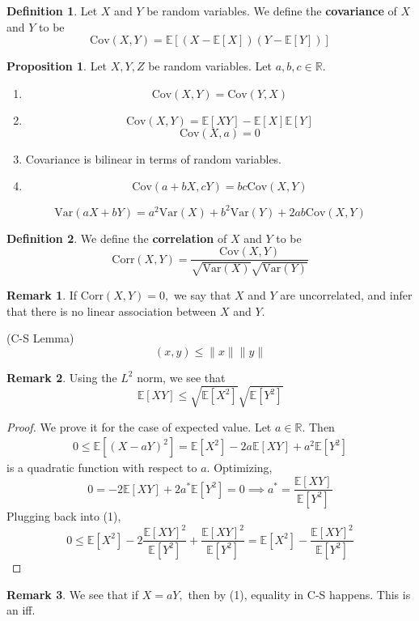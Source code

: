 \documentclass[10pt, oneside]{article}
\newcommand{\bbR}{\mathbb{R}}
\newcommand{\Var}{\text{Var}}
\newcommand{\Cov}{\text{Cov}}
\newcommand{\Corr}{\text{Corr}}
\newcommand{\bbE}{\mathbb{E}}
\theoremstyle{definition}
\newtheorem{defn}{Definition}
\newtheorem{prop}{Proposition}
\newtheorem{rem}{Remark}
\begin{document}
\begin{defn}
    Let $X$ and $Y$ be random variables. We define the \textbf{covariance} of $X$ and $Y$ to be 
    \[\Cov(X,Y) = \bbE[(X - \bbE[X])(Y - \bbE[Y])]\]
\end{defn}



\begin{prop}
    Let $X,Y,Z$ be random variables. Let $a,b,c \in \bbR.$
    \begin{enumerate}
        \item \[\Cov(X,Y) = \Cov(Y,X)\]
        \item \[\Cov(X,Y) = \bbE[XY] - \bbE[X]\bbE[Y]\]
        \[\Cov(X,a) = 0\]
        \item Covariance is bilinear in terms of random variables.
        \item \[\Cov(a + bX, cY) = bc\Cov(X,Y)\]
    \end{enumerate}
\end{prop}

\begin{lemma}
    \[\Var(aX + bY) = a^2\Var(X) + b^2\Var(Y) + 2ab\Cov(X,Y)\]
\end{lemma}
\begin{defn}
    We define the \textbf{correlation} of $X$ and $Y$ to be 
    \[\Corr(X,Y) = \frac{\Cov(X,Y)}{\sqrt{\Var(X)}\sqrt{ \Var(Y)}}\]
\end{defn}
\begin{rem}
    If $\Corr(X,Y)= 0,$ we say that $X$ and $Y$ are uncorrelated, and infer that there is no linear association between $X$ and $Y$. 
\end{rem}

\begin{lemma}
    (C-S Lemma) 
    \[(x,y) \leq \|x\|\|y\|\]
\end{lemma}
\begin{rem}
    Using the $L^2$ norm, we see that 
    \[\bbE[XY] \leq \sqrt{\bbE[X^2]}\sqrt{\bbE[Y^2]}\]
\end{rem}
\begin{proof}
    We prove it for the case of expected value. Let $a\in \bbR.$ Then 
    \begin{align*}
        0 \leq \bbE[(X - aY)^2]= \bbE[X^2] - 2a\bbE[XY] + a^2 \bbE[Y^2]
    \end{align*}
    is a quadratic function with respect to $a.$ Optimizing, 
    \[0 = -2\bbE[XY] + 2a^* \bbE[Y^2]= 0 \implies a^* = \frac{\bbE[XY]}{\bbE[Y^2]}\] Plugging back into (1), 
    \[0 \leq \bbE[X^2] - 2\frac{\bbE[XY]^2}{\bbE[Y^2]} + \frac{\bbE[XY]^2}{\bbE[Y^2]} = \bbE[X^2] - \frac{\bbE[XY]^2}{\bbE[Y^2]}\]
\end{proof}
\begin{rem}
    We see that if $X = aY,$ then by (1), equality in C-S happens. This is an iff.
\end{rem}
\end{document}
